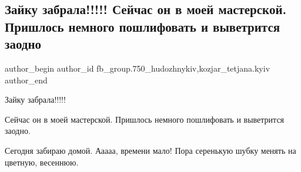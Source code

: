  
 
 
 
 

\subsection{Зайку забрала!!!!!  Сейчас он в моей мастерской. Пришлось немного пошлифовать и выветрится заодно}
\label{sec:17_03_2018.fb.fb_group.750_hudozhnykiv.1.zajku_zabrala_seichas_on_v_mojej_masterskoj}
 
\ifcmt
 author_begin
   author_id fb_group.750_hudozhnykiv,kozjar_tetjana.kyiv
 author_end
\fi

Зайку забрала!!!!!

Сейчас он в моей мастерской. Пришлось немного пошлифовать и выветрится заодно.

Сегодня забираю домой. Ааааа, времени мало! Пора серенькую шубку менять на
цветную, весеннюю.
